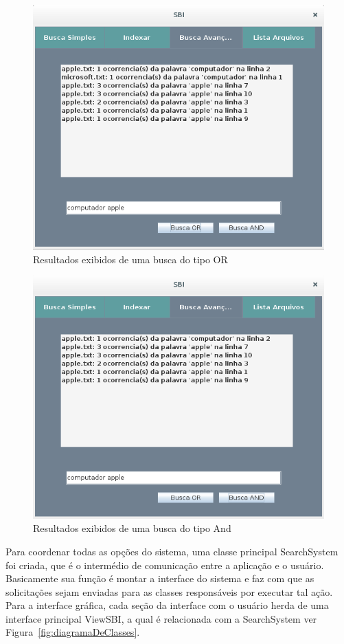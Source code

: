 \documentclass[12pt]{article}
\begin{document}
\begin{figure}[!htb]
\centering
\includegraphics[width=.9\textwidth]{img/buscaOr.png}
\caption{Resultados exibidos de uma busca do tipo OR}
\label{fig:buscaOrResultados}
\end{figure}

\begin{figure}[!htb]
\centering
\includegraphics[width=.9\textwidth]{img/buscaAnd.png}
\caption{Resultados exibidos de uma busca do tipo And}
\label{fig:buscaAndResultados}
\end{figure}

\newpage

	Para coordenar todas as opções do sistema, uma classe principal SearchSystem foi criada, que é o intermédio de comunicação entre a aplicação e o usuário. Basicamente sua função é montar a interface do sistema e faz com que as solicitações sejam enviadas para as classes responsáveis por executar tal ação. Para a interface gráfica, cada seção da interface com o usuário herda de uma interface principal ViewSBI, a qual é relacionada com a SearchSystem ver Figura~\ref{fig:diagramaDeClasses}.
\end{document}

